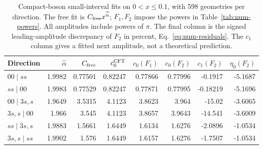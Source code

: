 \begin{table}[htbp]\centering\footnotesize
\setlength{\tabcolsep}{3.5pt}
\begin{tabular}{lrrrrrrr}\toprule
Direction & $\widehat\alpha$ & $C_{\rm free}$ & $c_0^{\rm CFT}$ & $c_0(F_1)$ & $c_0(F_2)$ & $c_1(F_2)$ & $\eta_0(F_2)$\\\midrule
$00\mid ss$ & 1.9982 & 0.77501 & 0.82247 & 0.77866 & 0.77996 & -0.1917 & -5.1687\\
$ss\mid 00$ & 1.9983 & 0.77529 & 0.82247 & 0.77871 & 0.77995 & -0.18219 & -5.1696\\
$00\mid 3s,s$ & 1.9649 & 3.5315 & 4.1123 & 3.8623 & 3.964 & -15.02 & -3.6065\\
$3s,s\mid 00$ & 1.966 & 3.545 & 4.1123 & 3.8657 & 3.9643 & -14.541 & -3.6009\\
$ss\mid 3s,s$ & 1.9883 & 1.5661 & 1.6449 & 1.6134 & 1.6276 & -2.0896 & -1.0534\\
$3s,s\mid ss$ & 1.9902 & 1.576 & 1.6449 & 1.6157 & 1.6276 & -1.7507 & -1.0534\\
\bottomrule\end{tabular}
\caption{Compact-boson small-interval fits on $0<x\leq0.1$, with 598 geometries per direction. The free fit is $C_{\rm free}x^{\widehat\alpha}$; $F_1,F_2$ impose the powers in Table~\ref{tab:num-powers}. All amplitudes include powers of $\pi$. The final column is the signed leading-amplitude discrepancy of $F_2$ in percent, Eq.~\eqref{eq:num-residuals}. The $c_1$ column gives a fitted next amplitude, not a theoretical prediction.}
\label{tab:num-boson-small}
\end{table}
